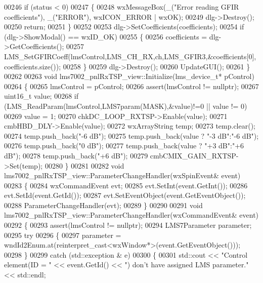\begin{DoxyCode}
{{{00246     \textcolor{keywordflow}{if} (status < 0)
00247     \{
00248         wxMessageBox(\_(\textcolor{stringliteral}{"Error reading GFIR coefficients"}), \_(\textcolor{stringliteral}{"ERROR"}), wxICON\_ERROR | wxOK);
00249         dlg->Destroy();
00250         \textcolor{keywordflow}{return};
00251     \}
00252 
00253     dlg->SetCoefficients(coefficients);
00254     \textcolor{keywordflow}{if} (dlg->ShowModal() == wxID\_OK)
00255     \{
00256         coefficients = dlg->GetCoefficients();
00257         LMS_SetGFIRCoeff(lmsControl,LMS_CH_RX,ch,LMS_GFIR3,&coefficients[0],coefficients.size());
00258     \}
00259     dlg->Destroy();
00260     UpdateGUI();
00261 \}
00262 
00263 \textcolor{keywordtype}{void} lms7002_pnlRxTSP_view::Initialize(lms_device_t* pControl)
00264 \{
00265     lmsControl = pControl;
00266     assert(lmsControl != \textcolor{keyword}{nullptr});
00267     uint16\_t value;
00268     \textcolor{keywordflow}{if} (LMS_ReadParam(lmsControl,LMS7param(MASK),&value)!=0  || value != 0)
00269          value = 1;
00270     chkDC_LOOP_RXTSP->Enable(value);
00271     cmbHBD_DLY->Enable(value);
00272     wxArrayString temp;
00273     temp.clear();
00274     temp.push\_back(\textcolor{stringliteral}{"-6 dB"});
00275     temp.push\_back(value ? \textcolor{stringliteral}{"-3 dB"}:\textcolor{stringliteral}{"-6 dB"});
00276     temp.push\_back(\textcolor{stringliteral}{"0 dB"});
00277     temp.push\_back(value ? \textcolor{stringliteral}{"+3 dB"}:\textcolor{stringliteral}{"+6 dB"});
00278     temp.push\_back(\textcolor{stringliteral}{"+6 dB"});
00279     cmbCMIX_GAIN_RXTSP->Set(temp);
00280 \}
00281 
00282 \textcolor{keywordtype}{void} lms7002_pnlRxTSP_view::ParameterChangeHandler(wxSpinEvent& event)
00283 \{
00284     wxCommandEvent evt;
00285     evt.SetInt(event.GetInt());
00286     evt.SetId(event.GetId());
00287     evt.SetEventObject(event.GetEventObject());
00288     ParameterChangeHandler(evt);
00289 \}
00290 
00291 \textcolor{keywordtype}{void} lms7002_pnlRxTSP_view::ParameterChangeHandler(wxCommandEvent& event)
00292 \{
00293     assert(lmsControl != \textcolor{keyword}{nullptr});
00294     LMS7Parameter parameter;
00295     \textcolor{keywordflow}{try}
00296     \{
00297         parameter = wndId2Enum.at(reinterpret\_cast<wxWindow*>(event.GetEventObject()));
00298     \}
00299     \textcolor{keywordflow}{catch} (std::exception & e)
00300     \{
00301         std::cout << \textcolor{stringliteral}{"Control element(ID = "} << \textcolor{keyword}{event}.GetId() << \textcolor{stringliteral}{") don't have assigned LMS parameter."} << 
      std::endl;
}}}
\end{DoxyCode}
